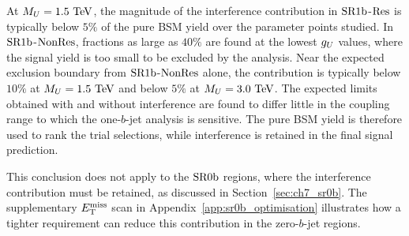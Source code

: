At $M_U=1.5~\mathrm{TeV}$, the magnitude of the interference contribution in $\mathrm{SR1b}$-$\mathrm{Res}$ is typically below $5\%$ of the pure BSM yield over the parameter points studied.
In $\mathrm{SR1b}$-$\mathrm{NonRes}$, fractions as large as $40\%$ are found at the lowest $g_U$ values, where the signal yield is too small to be excluded by the analysis.
Near the expected exclusion boundary from $\mathrm{SR1b}$-$\mathrm{NonRes}$ alone, the contribution is typically below $10\%$ at $M_U=1.5~\mathrm{TeV}$ and below $5\%$ at $M_U=3.0~\mathrm{TeV}$.
The expected limits obtained with and without interference are found to differ little in the coupling range to which the one-$b$-jet analysis is sensitive.
The pure BSM yield is therefore used to rank the trial selections, while interference is retained in the final signal prediction.

This conclusion does not apply to the $\mathrm{SR0b}$ regions, where the interference contribution must be retained, as discussed in Section~\ref{sec:ch7_sr0b}.
The supplementary $E_{\mathrm{T}}^{\mathrm{miss}}$ scan in Appendix~\ref{app:sr0b_optimisation} illustrates how a tighter requirement can reduce this contribution in the zero-$b$-jet regions.
